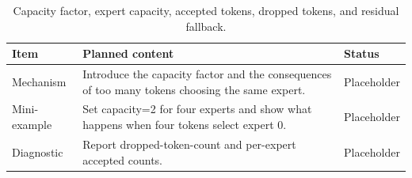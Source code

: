 \begin{table}[H]
\centering
\caption{Capacity factor, expert capacity, accepted tokens, dropped tokens, and residual fallback.}
\label{tab:ch04-capacity-and-dropped-tokens}
\begin{tabularx}{\textwidth}{p{}X p{}}
\toprule
Item & Planned content & Status \\
\midrule
Mechanism & Introduce the capacity factor and the consequences of too many tokens choosing the same expert. & Placeholder \\
Mini-example & Set capacity=2 for four experts and show what happens when four tokens select expert 0. & Placeholder \\
Diagnostic & Report dropped-token-count and per-expert accepted counts. & Placeholder \\
\bottomrule
\end{tabularx}
\end{table}
